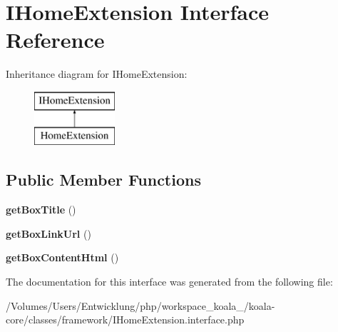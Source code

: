 \hypertarget{interface_i_home_extension}{
\section{IHomeExtension Interface Reference}
\label{interface_i_home_extension}
}
Inheritance diagram for IHomeExtension:\begin{figure}[H]
\begin{center}
\leavevmode
\includegraphics[height=2.000000cm]{interface_i_home_extension}
\end{center}
\end{figure}
\subsection*{Public Member Functions}
\begin{DoxyCompactItemize}
\item 
\hypertarget{interface_i_home_extension_ae275396695c3c4a8230ea8f463c9f64f}{
{\bfseries getBoxTitle} ()}
\label{interface_i_home_extension_ae275396695c3c4a8230ea8f463c9f64f}

\item 
\hypertarget{interface_i_home_extension_a13acfe6005a051d9027f900f6e888fb6}{
{\bfseries getBoxLinkUrl} ()}
\label{interface_i_home_extension_a13acfe6005a051d9027f900f6e888fb6}

\item 
\hypertarget{interface_i_home_extension_a0e3006f2ec5c401691b6dd1ff9249ba9}{
{\bfseries getBoxContentHtml} ()}
\label{interface_i_home_extension_a0e3006f2ec5c401691b6dd1ff9249ba9}

\end{DoxyCompactItemize}


The documentation for this interface was generated from the following file:\begin{DoxyCompactItemize}
\item 
/Volumes/Users/Entwicklung/php/workspace\_\-koala\_/koala-\/core/classes/framework/IHomeExtension.interface.php\end{DoxyCompactItemize}
